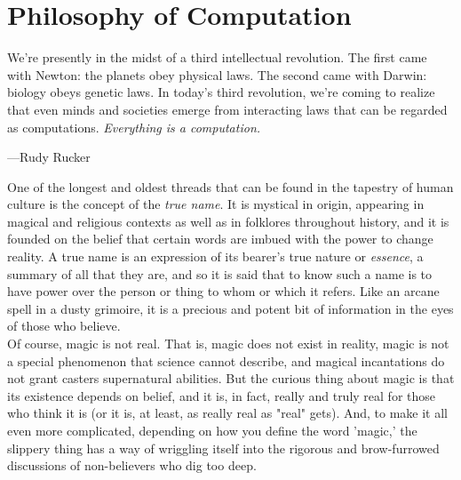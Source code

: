 \part*{Philosophy of Computation}

\vspace{4mm}
\begin{displayquote}
    We're presently in the midst of a third intellectual revolution. The first came with Newton: the planets obey physical laws. The second came with Darwin: biology obeys genetic laws. In today’s third revolution, we're coming to realize that even minds and societies emerge from interacting laws that can be regarded as computations. \textit{Everything is a computation.}
	\vspace{2mm}
	\begin{flushright}
		---Rudy Rucker
	\end{flushright}
\end{displayquote}
\vspace{4mm}


One of the longest and oldest threads that can be found in the tapestry of human culture is the concept of the \textit{true name}. It is mystical in origin, appearing in magical and religious contexts as well as in folklores throughout history, and it is founded on the belief that certain words are imbued with the power to change reality. A true name is an expression of its bearer's true nature or \textit{essence}, a summary of all that they are, and so it is said that to know such a name is to have power over the person or thing to whom or which it refers. Like an arcane spell in a dusty grimoire, it is a precious and potent bit of information in the eyes of those who believe. \\

Of course, magic is not real. That is, magic does not exist in reality, magic is not a special phenomenon that science cannot describe, and magical incantations do not grant casters supernatural abilities. But the curious thing about magic is that its existence depends on belief, and it is, in fact, really and truly real for those who think it is (or it is, at least, as really real as "real" gets). And, to make it all even more complicated, depending on how you define the word 'magic,' the slippery thing has a way of wriggling itself into the rigorous and brow-furrowed discussions of non-believers who dig too deep.

